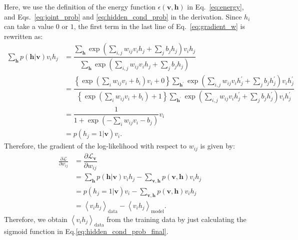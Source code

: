 \documentclass[10pt, a4paper]{article}
\begin{document}
Here, we use the definition of the energy function $\epsilon(\mathbf{v}, \mathbf{h})$ in Eq.~\eqref{eq:energy},
and Eqs.~\eqref{eq:joint_prob} and \eqref{eq:hidden_cond_prob} in the derivation.
Since $h_i$ can take a value $0$ or $1$, the first term in the last line of Eq.~\eqref{eq:gradient_w}
is rewritten as:
\begin{align}
  \sum_{\mathbf{h}} p(\mathbf{h}|\mathbf{v}) v_i h_j &
    = \dfrac{\sum_{\mathbf{h}} \exp\left(\sum_{i,j}w_{ij}v_i h_j+\sum_j b_j h_j\right) v_i h_j}
          {\sum_{\mathbf{h}} \exp\left(\sum_{i,j}w_{ij}v_i h_j+\sum_j b_j h_j\right)} \nonumber \\
    &= \dfrac{\left\{\exp\left(\sum_i w_{ij} v_i+b_i\right) v_i +0\right\}
      \sum_{\mathbf{h}^\prime} \exp\left(\sum_{i,j}w_{ij}v_i h^\prime_j+\sum_j b_j h^\prime_j\right) v_i h^\prime_j}
          {\left\{\exp\left(\sum_i w_{ij} v_i+b_i\right) + 1\right\}
                  \sum_{\mathbf{h}^\prime} \exp\left(\sum_{i,j}w_{ij}v_i h^\prime_j+\sum_j b_j h^\prime_j\right)
                          v_i h^\prime_j} \nonumber \\
    &= \dfrac{1}{1 + \exp\left(-\sum_i w_{ij} v_i - b_j\right)} v_i \nonumber \\
    &= p(h_j=1|\mathbf{v}) v_i. \label{eq:gradient_w_first_term}
\end{align}
Therefore, the gradient of the log-likelihood with respect to $w_{ij}$ is given by:
\begin{align}
   \frac{\partial \mathcal{L}}{\partial w_{ij}} &= \dfrac{\partial \mathcal{L}_{\mathbf{v}}}{\partial w_{ij}} \nonumber \\
    &= \sum_{\mathbf{h}} p(\mathbf{h}|\mathbf{v}) v_i h_j
        - \sum_{\mathbf{v}, \mathbf{h}} p(\mathbf{v},\mathbf{h}) v_i h_j \nonumber \\
    &= p(h_j=1|\mathbf{v}) v_i - \sum_{\mathbf{v}, \mathbf{h}} p(\mathbf{v},\mathbf{h}) v_i h_j \nonumber \\
    &= \left<v_i h_j\right>_{\text{data}} - \left<v_i h_j\right>_{\text{model}}. \label{eq:gradient_w_final}
\end{align}
Therefore, we obtain $\left<v_i h_j\right>_{\text{data}}$ from the training data by just calculating
the sigmoid function in Eq.\eqref{eq:hidden_cond_prob_final}.
\end{document}
